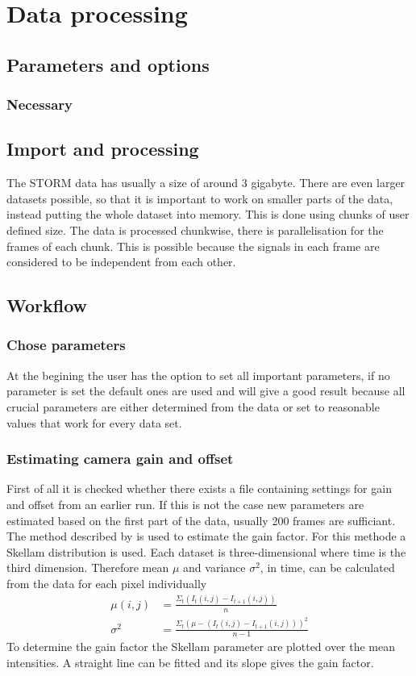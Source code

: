 \chapter{Data processing}

\section{Parameters and options}
\subsection{Necessary}

\section{Import and processing}
The STORM data has usually a size of around 3 gigabyte. There are even larger datasets possible, so that it is important to work on smaller parts of the data, instead putting the whole dataset into memory. This is done using chunks of user defined size. The data is processed chunkwise, there is parallelisation for the frames of each chunk. This is possible because the signals in each frame are considered to be independent from each other.  

\section{Workflow}
\subsection{Chose parameters}
At the begining the user has the option to set all important parameters, if no parameter is set the default ones are used and will give a good result because all crucial parameters are either determined from the data or set to reasonable values that work for every data set.
\subsection{Estimating camera gain and offset}
First of all it is checked whether there exists a file containing settings for gain and offset from an earlier run. If this is not the case new parameters are estimated based on the first part of the data, usually 200 frames are sufficiant.\newline
The method described by \cite{skellam} is used to estimate the
gain factor. For this methode a Skellam distribution is used. 
Each dataset is three-dimensional where time is the third
dimension. Therefore mean $\mu$ and variance $\sigma^2$, in time, can be calculated from
the data for each pixel individually
\begin{align}
	\mu(i,j) & = \frac{\Sigma_t(I_t(i,j)-I_{t+1}(i,j))}{n}\\
	\sigma^2 & = \frac{\Sigma_t(\mu-(I_t(i,j)-I_{t+1}(i,j)))^2}{n-1}
\end{align} 
To determine the gain factor the Skellam parameter are plotted over the mean
intensities. A straight line can be fitted and its slope gives the gain
factor.
